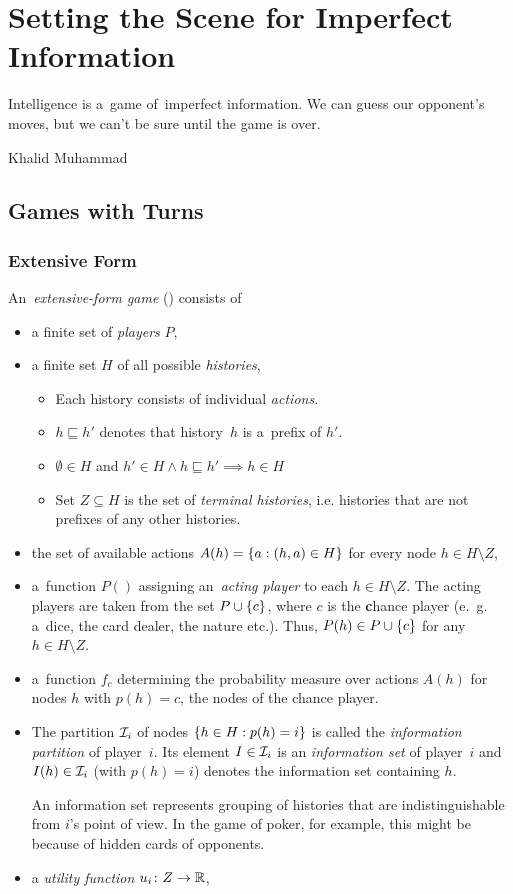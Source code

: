 \chapter{Setting the Scene for Imperfect Information}
\epigraph{
  Intelligence is a~game of~imperfect information.
  We can guess our opponent's moves, but we can't be sure until the game is over.
}{Khalid Muhammad}

\section{Games with Turns}

\subsection{Extensive Form}
\label{ssec:extensive-form}

An~\emph{extensive-form game} (\cite[p.~200]{Osborne1994course}) consists of

\begin{itemize}
  \item a finite set of \emph{players} $P$,
  \item a finite set $H$ of all possible \emph{histories},
    \begin{itemize}
      \item Each history consists of individual \emph{actions}.
      \item $h \sqsubseteq h'$ denotes that history~$h$ is a~prefix of $h'$.
      \item $\emptyset \in H$ and $h' \in H \land h \sqsubseteq h' \implies h \in H$
      \item Set $Z \subseteq H$ is the set of \emph{terminal histories}, i.e. histories that are not prefixes of any other histories.
    \end{itemize}
  \item the set of available actions $A(h) = \left\{ a: (h, a) \in H \right\}$ for every node $h \in H \setminus Z$,
  \item a~function $P()$ assigning an~\emph{acting player} to each $h \in H \setminus Z$.
    The acting players are taken from the set $P \cup \left\{ c \right\}$, where $c$ is the \textbf{c}hance player (e.~g. a~dice, the card dealer, the nature etc.).
    Thus, $P(h) \in P \cup \left\{ c \right\}$ for any $h \in H \setminus Z$.
  \item a~function $f_c$ determining the probability measure over actions $A(h)$ for nodes $h$ with $p(h) = c$, the nodes of the chance player.
  \item The partition $\mathcal{I}_i$ of nodes $\left\{ h \in H: p(h) = i \right\}$ is called the \emph{information partition} of player~$i$.
    Its element $I \in \mathcal{I}_i$ is an \emph{information set} of player~$i$ and $I(h) \in \mathcal{I}_i$ (with $p(h) = i$) denotes the information set containing $h$.

    An information set represents grouping of histories that are indistinguishable from $i$'s point of view.
    In the game of poker, for example, this might be because of hidden cards of opponents.
  \item a \emph{utility function} $u_i\colon Z \rightarrow \mathbb{R}$,
\end{itemize}

